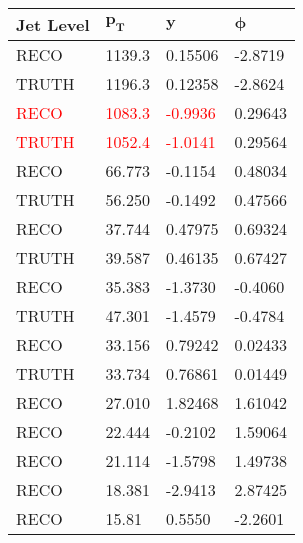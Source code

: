 \documentclass[compress]{beamer}
\begin{document}
\begin{frame}
\begin{columns}[onlytextwidth]
\begin{column}{0.5\textwidth}
\begin{table}
\begin{tabular}{l l l l}
        \bottomrule
      \end{tabular}
    \end{table}
  \end{column}
  \begin{column}{0.5\textwidth}
    \begin{table}
      \begin{tabular}{l l l l}
        \toprule
        \textbf{Jet Level} & $\mathbf{p_T}$ & $\mathbf{y}$ & $\mathbf{\phi}$ \\
        \midrule
        RECO   &  1139.3 &   0.15506 &  -2.8719 \\
        TRUTH  &  1196.3 &   0.12358 &  -2.8624 \\
        \midrule                                
        \textcolor{red}{RECO}   &  \textcolor{red}{1083.3} & \textcolor{red}{-0.9936} &  0.29643 \\
        \textcolor{red}{TRUTH}  &  \textcolor{red}{1052.4} & \textcolor{red}{-1.0141} &  0.29564 \\
        \midrule                                
        RECO   &  66.773 &   -0.1154 &  0.48034 \\
        TRUTH  &  56.250 &   -0.1492 &  0.47566 \\
        \midrule                                
        RECO   &  37.744 &   0.47975 &  0.69324 \\
        TRUTH  &  39.587 &   0.46135 &  0.67427 \\
        \midrule                                
        RECO   &  35.383 &   -1.3730 &  -0.4060 \\
        TRUTH  &  47.301 &   -1.4579 &  -0.4784 \\
        \midrule                                
        RECO   &  33.156 &   0.79242 &  0.02433 \\
        TRUTH  &  33.734 &   0.76861 &  0.01449 \\
        \midrule                                
        \midrule                                
        RECO   &  27.010 &   1.82468 &  1.61042 \\
        RECO   &  22.444 &   -0.2102 &  1.59064 \\
        RECO   &  21.114 &   -1.5798 &  1.49738 \\
        RECO   &  18.381 &   -2.9413 &  2.87425 \\
        RECO   &   15.81 &    0.5550 &  -2.2601 \\
        \bottomrule
      \end{tabular}
    \end{table}
  \end{column}
\end{columns}
\normalsize
\end{frame}
\end{document}
